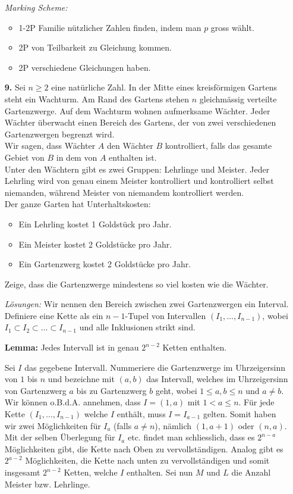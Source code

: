 \documentclass[language=german,style=solution]{smo}
\begin{document}
\begin{enumerate}
\textit{Marking Scheme:}
\begin{itemize}
	\item 1-2P Familie nützlicher Zahlen finden, indem man $p$ gross wählt.
	\item 2P von Teilbarkeit zu Gleichung kommen.
	\item 2P verschiedene Gleichungen haben.
\end{itemize}

\newpage

\item[\textbf{9.}] %
Sei $n \geq 2$ eine natürliche Zahl. In der Mitte eines kreisförmigen Gartens steht ein Wachturm. Am Rand des Gartens stehen $n$ gleichmässig verteilte Gartenzwerge. Auf dem Wachturm wohnen aufmerksame Wächter. Jeder Wächter überwacht einen Bereich des Gartens, der von zwei verschiedenen Gartenzwergen begrenzt wird.\\
Wir sagen, dass Wächter $A$ den Wächter $B$ kontrolliert, falls das gesamte Gebiet von $B$ in dem von $A$ enthalten ist.\\
Unter den Wächtern gibt es zwei Gruppen: Lehrlinge und Meister. Jeder Lehrling wird von genau einem Meister kontrolliert und kontrolliert selbst niemanden, während Meister von niemandem kontrolliert werden.\\
Der ganze Garten hat Unterhaltskosten:
\begin{itemize}
\item Ein Lehrling kostet 1 Goldstück pro Jahr.
\item Ein Meister kostet 2 Goldstücke pro Jahr.
\item Ein Gartenzwerg kostet 2 Goldstücke pro Jahr.
\end{itemize}
Zeige, dass die Gartenzwerge mindestens so viel kosten wie die Wächter.

\textit{Lösungen:}
Wir nennen den Bereich zwischen zwei Gartenzwergen ein Interval. Definiere eine Kette als ein $n-1$-Tupel von Intervallen $(I_1,\dots,I_{n-1})$, wobei $I_1 \subset I_2\subset\dots \subset I_{n-1}$ und alle Inklusionen strikt sind.

\textbf{Lemma:} Jedes Intervall ist in genau $2^{n-2}$ Ketten enthalten.

Sei $I$ das gegebene Intervall. Nummeriere die Gartenzwerge im Uhrzeigersinn von $1$ bis $n$ und bezeichne mit $(a,b)$ das Intervall, welches im Uhrzeigersinn von Gartenzwerg $a$ bis zu Gartenzwerg $b$ geht, wobei $1\leq a,b\leq n$ und $a\neq b$. Wir können o.B.d.A. annehmen, dass $I=(1,a)$ mit $1<a\leq n$. Für jede Kette $(I_1,\dots,I_{n-1})$ welche $I$ enthält, muss $I = I_{a-1}$ gelten. Somit haben wir zwei Möglichkeiten für $I_a$ (falls $a \neq n$), nämlich $(1,a+1)$ oder $(n,a)$. Mit der selben Überlegung für $I_a$ etc. findet man schliesslich, dass es $2^{n-a}$ Möglichkeiten gibt, die Kette nach Oben zu vervollständigen. Analog gibt es $2^{a-2}$ Möglichkeiten, die Kette nach unten zu vervollständigen und somit insgesamt $2^{n-2}$ Ketten, welche $I$ enthalten.
Sei nun $M$ und $L$ die Anzahl Meister bzw. Lehrlinge. 


\end{enumerate}
\end{document}

